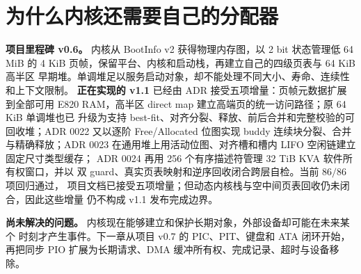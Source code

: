 \chapter{为什么内核还需要自己的分配器}

\begin{statebox}
\textbf{项目里程碑 v0.6。} 内核从 BootInfo v2 获得物理内存图，以 2 bit 状态管理低
64 MiB 的 4 KiB 页帧，保留平台、内核和启动栈，再建立自己的四级页表与 64 KiB 高半区
早期堆。单调堆足以服务启动对象，却不能处理不同大小、寿命、连续性和上下文限制。
\textbf{正在实现的 v1.1} 已经由 ADR 接受五项增量：页帧元数据扩展到全部可用
E820 RAM，高半区 direct map 建立高端页的统一访问路径；原 64 KiB 单调堆也已
升级为支持 best-fit、对齐分裂、释放、前后合并和完整校验的可回收堆；ADR 0022
又以逐阶 Free/Allocated 位图实现 buddy 连续块分裂、合并与精确释放；ADR 0023
在通用堆上用活动位图、对齐槽和槽内 LIFO 空闲链建立固定尺寸类型缓存；
ADR 0024 再用 256 个有序描述符管理 32 TiB KVA 软件所有权窗口，并以
双 guard、真实页表映射和逆序回收闭合跨层自检。当前 \(86/86\) 项回归通过，
项目文档已接受五项增量；但动态内核栈与空中间页表回收仍未闭合，因此这些增量
仍不构成 v1.1 发布完成边界。
\end{statebox}



\begin{problemframe}
\textbf{尚未解决的问题。} 内核现在能够建立和保护长期对象，外部设备却可能在未来某个
时刻才产生事件。下一章从项目 v0.7 的 PIC、PIT、键盘和 ATA 闭环开始，再把同步 PIO
扩展为长期请求、DMA 缓冲所有权、完成记录、超时与设备移除。
\end{problemframe}
